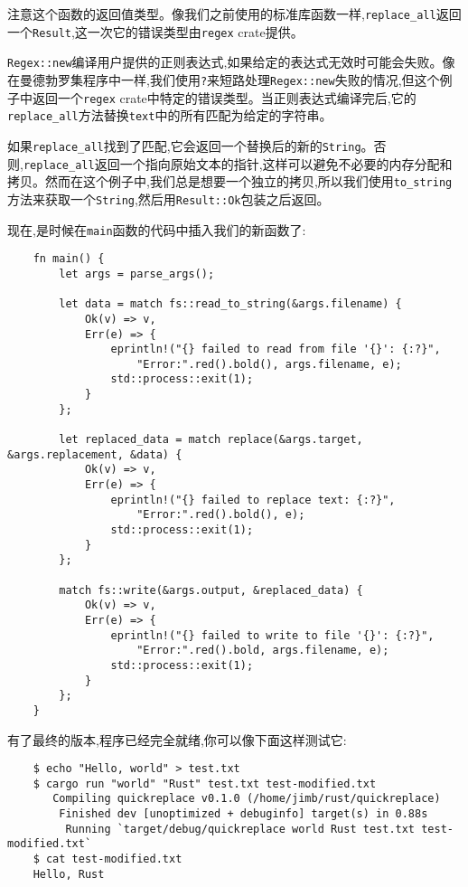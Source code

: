 注意这个函数的返回值类型。像我们之前使用的标准库函数一样,\texttt{replace\_all}返回一个\texttt{Result},这一次它的错误类型由\texttt{regex} crate提供。

\texttt{Regex::new}编译用户提供的正则表达式,如果给定的表达式无效时可能会失败。像在曼德勃罗集程序中一样,我们使用\texttt{?}来短路处理\texttt{Regex::new}失败的情况,但这个例子中返回一个\texttt{regex} crate中特定的错误类型。当正则表达式编译完后,它的\texttt{replace\_all}方法替换\texttt{text}中的所有匹配为给定的字符串。

如果\texttt{replace\_all}找到了匹配,它会返回一个替换后的新的\texttt{String}。否则,\texttt{replace\_all}返回一个指向原始文本的指针,这样可以避免不必要的内存分配和拷贝。然而在这个例子中,我们总是想要一个独立的拷贝,所以我们使用\texttt{to\_string}方法来获取一个\texttt{String},然后用\texttt{Result::Ok}包装之后返回。

现在,是时候在\texttt{main}函数的代码中插入我们的新函数了:
\begin{verbatim}
    fn main() {
        let args = parse_args();

        let data = match fs::read_to_string(&args.filename) {
            Ok(v) => v,
            Err(e) => {
                eprintln!("{} failed to read from file '{}': {:?}",
                    "Error:".red().bold(), args.filename, e);
                std::process::exit(1);
            }
        };

        let replaced_data = match replace(&args.target, &args.replacement, &data) {
            Ok(v) => v,
            Err(e) => {
                eprintln!("{} failed to replace text: {:?}",
                    "Error:".red().bold(), e);
                std::process::exit(1);
            }
        };

        match fs::write(&args.output, &replaced_data) {
            Ok(v) => v,
            Err(e) => {
                eprintln!("{} failed to write to file '{}': {:?}",
                    "Error:".red().bold, args.filename, e);
                std::process::exit(1);
            }
        };
    }
\end{verbatim}

有了最终的版本,程序已经完全就绪,你可以像下面这样测试它:
\begin{verbatim}
    $ echo "Hello, world" > test.txt
    $ cargo run "world" "Rust" test.txt test-modified.txt
       Compiling quickreplace v0.1.0 (/home/jimb/rust/quickreplace)
        Finished dev [unoptimized + debuginfo] target(s) in 0.88s
         Running `target/debug/quickreplace world Rust test.txt test-modified.txt`
    $ cat test-modified.txt
    Hello, Rust
\end{verbatim}

